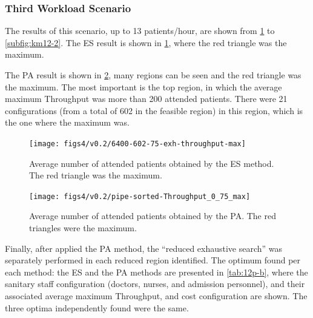 \documentclass[11pt]{article} %
\begin{document}

\subsubsection{Third Workload Scenario}
\label{ssub:Case-Study-3A}

The results of this scenario, up to 13 patients/hour, are shown from
\ref{subfig:es12-2} to \ref{subfig:km12-2}. The ES result is shown
in \ref{subfig:es12-2}, where the red triangle was the maximum. 

The PA result is shown in \ref{subfig:pipe12-2}, many regions can
be seen and the red triangle was the maximum. The most important is
the top region, in which the average maximum Throughput was more than
200 attended patients. There were 21 configurations (from a total
of 602 in the feasible region) in this region, which is the one where
the maximum was.

\begin{figure}[H]
\centering{}\texttt{[image: figs4/v0.2/6400-602-75-exh-throughput-max]}\caption{Average number of attended patients obtained by the ES method. The
red triangle was the maximum. \label{subfig:es12-2}}
\end{figure}
 
\begin{figure}[H]
\centering{}\texttt{[image: figs4/v0.2/pipe-sorted-Throughput\_0\_75\_max]}\caption{Average number of attended patients obtained by the PA. The red triangles
were the maximum.\label{subfig:pipe12-2}}
\end{figure}

Finally, after applied  the PA  method, the \textquotedblleft{}reduced exhaustive search\textquotedblright{}
was separately performed in each reduced region identified. The optimum
found per each method: the ES and the PA
methods are presented in \ref{tab:12p-b}, where the sanitary staff
configuration (doctors, nurses, and admission personnel), and their
associated average maximum Throughput, and cost configuration are
shown. The three optima independently found were the same.
\end{document}
